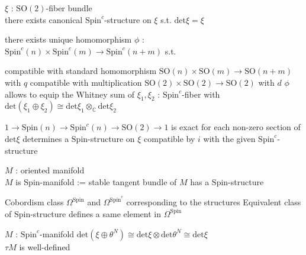 \documentclass[dvipdfmx]{jsarticle}
\begin{document}
\begin{Theorem}
\itemprop
  \For \(\xi\) : \(\text{SO}(2)\)-fiber bundle \\
  \Then there exists canonical \(\text{Spin}^c\)-structure on \(\xi\) s.t. \(\text{det} \xi = \xi\)
\end{Theorem}

\begin{Theorem}
\itemprop
  \Then there exists unique homomorphism \(\phi\) : \(\text{Spin}^c(n) \times \text{Spin}^c(m) \to \text{Spin}^c(n+m)\) s.t. 
  \begin{itemize}
    \itemwith compatible with standard homomorphism \(\text{SO}(n) \times \text{SO}(m) \to \text{SO}(n+m)\) with \(q\)
    \itemwith compatible with multiplication \(\text{SO}(2) \times \text{SO}(2) \to \text{SO}(2)\) with \(d\)
    \itemwith \(\phi\) allows to equip the Whitney sum of \(\xi_1, \xi_2\) : \(\text{Spin}^c\)-fiber with \(\text{det} (\xi_1 \oplus \xi_2) \cong \text{det} \xi_1 \otimes_{\mathbb{C}} \text{det} \xi_2\)
  \end{itemize}
\end{Theorem}

\begin{Theorem}
\itemprop
  \Then \(1 \to \text{Spin}(n) \to \text{Spin}^c(n) \to \text{SO}(2) \to 1\) is exact
\itemprop
  \Then for each non-zero section of \(\text{det} \xi\) determines a \(\text{Spin}\)-structure on \(\xi\) compatible by \(i\) with the given \(\text{Spin}^c\)-structure
\end{Theorem}

\begin{Definition}
\itemdefi
  \For \(M\) : oriented manifold \\
  \Define \(M\) is Spin-manifold := stable tangent bundle of \(M\) has a \(\text{Spin}\)-structure
\end{Definition}

\begin{Theorem}
\itemprop
  Cobordism class \(\Omega^{\text{Spin}}\) and \(\Omega^{\text{Spin}^c}\) corresponding to the structures
\itemprop
  Equivalent class of \(\text{Spin}\)-structure defines a same element in \(\Omega^{\text{Spin}}\)
\end{Theorem}

\begin{Theorem}
\itemwhen
  \Let \(M\) : \(\text{Spin}^c\)-manifold
\itemprop
  \Then \(\text{det} (\xi \oplus \theta^N) \cong \text{det} \xi \otimes \text{det} \theta^N \cong \text{det} \xi\) \\
  \Then \(\tau M\) is well-defined
\end{Theorem}
\end{document}
